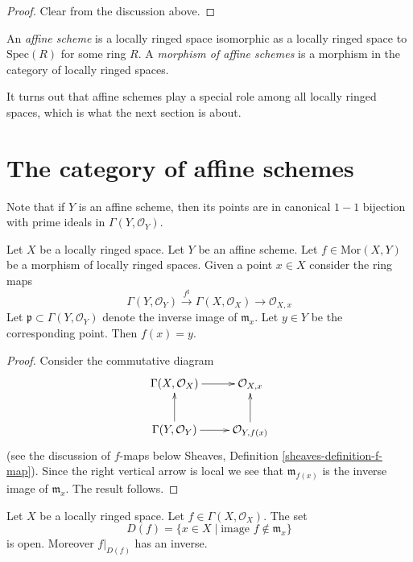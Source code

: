 \begin{proof}
Clear from the discussion above.
\end{proof}

\begin{definition}
\label{definition-affine-scheme}
An {\it affine scheme} is a locally ringed space isomorphic
as a locally ringed space to $\text{Spec}(R)$ for some ring $R$. 
A {\it morphism of affine schemes} is a morphism in the category
of locally ringed spaces.
\end{definition}

\noindent
It turns out that affine schemes play a special role
among all locally ringed spaces, which is what the next
section is about.

\section{The category of affine schemes}
\label{section-category-affine-schemes}

\noindent
Note that if $Y$ is an affine scheme, then its
points are in canonical $1-1$ bijection with
prime ideals in $\Gamma(Y, \mathcal{O}_Y)$.

\begin{lemma}
\label{lemma-morphism-into-affine-where-point-goes}
Let $X$ be a locally ringed space.
Let $Y$ be an affine scheme.
Let $f \in \text{Mor}(X, Y)$ be a morphism
of locally ringed spaces. Given a point $x \in X$
consider the ring maps
$$
\Gamma(Y, \mathcal{O}_Y) \xrightarrow{f^\sharp}
\Gamma(X, \mathcal{O}_X) \to \mathcal{O}_{X, x}
$$
Let $\mathfrak p \subset \Gamma(Y, \mathcal{O}_Y)$ denote
the inverse image of $\mathfrak m_x$. Let $y \in Y$ be the
corresponding point. Then $f(x) = y$.
\end{lemma}

\begin{proof}
Consider the commutative diagram
$$
\xymatrix{
\Gamma(X, \mathcal{O}_X) \ar[r] &
\mathcal{O}_{X, x} \\
\Gamma(Y, \mathcal{O}_Y) \ar[r] \ar[u] &
\mathcal{O}_{Y, f(x)} \ar[u]
}
$$
(see the discussion of $f$-maps below
Sheaves, Definition \ref{sheaves-definition-f-map}).
Since the right vertical arrow is local
we see that $\mathfrak m_{f(x)}$ is the
inverse image of $\mathfrak m_x$. The result
follows.
\end{proof}

\begin{lemma}
\label{lemma-f-open}
Let $X$ be a locally ringed space.
Let $f \in \Gamma(X, \mathcal{O}_X)$.
The set
$$
D(f) = \{x \in X \mid \text{image }f \not\in \mathfrak m_x\}
$$
is open. Moreover $f|_{D(f)}$ has an inverse.
\end{lemma}

